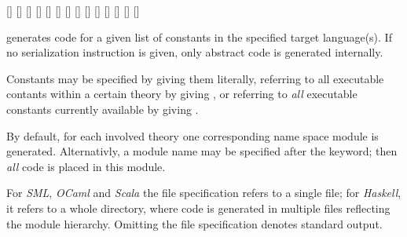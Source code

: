 \begin{isabellebody}
\begin{isamarkuptext}
\begin{railoutput}
\rail@bar
{}[]
\rail@plus
\rail@plus
{}[]
[]
\rail@endplus
{}
[]
\rail@endplus
\rail@endbar
\rail@endbar
{}
\rail@bar
{}
[]
\rail@plus
{}[]
\rail@endplus
\rail@endbar
\rail@bar
{}
[]
[]
\rail@endbar
\rail@end
{}
\rail@bar
{}[]
\rail@bar
{}[]
[]
[]
\rail@endbar
{}[]
[]
\rail@endbar
\rail@end
\end{railoutput}


  \begin{description}

  \item \hyperlink{command.HOL.export-code}{\mbox{}} generates code for a given list
  of constants in the specified target language(s).  If no
  serialization instruction is given, only abstract code is generated
  internally.

  Constants may be specified by giving them literally, referring to
  all executable contants within a certain theory by giving , or referring to \emph{all} executable constants currently
  available by giving .

  By default, for each involved theory one corresponding name space
  module is generated.  Alternativly, a module name may be specified
  after the \hyperlink{keyword.module-name}{\mbox{}} keyword; then \emph{all} code is
  placed in this module.

  For \emph{SML}, \emph{OCaml} and \emph{Scala} the file specification
  refers to a single file; for \emph{Haskell}, it refers to a whole
  directory, where code is generated in multiple files reflecting the
  module hierarchy.  Omitting the file specification denotes standard
  output.


\end{description}
\end{isamarkuptext}
\end{isabellebody}
